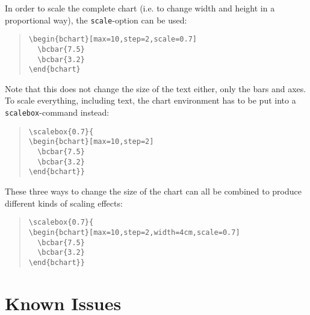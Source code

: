 \documentclass{article}
\begin{document}
In order to scale the complete chart (i.e. to change width and height in a proportional way), the \texttt{scale}-option can be used:
\begin{quote}\small
\begin{verbatim}
\begin{bchart}[max=10,step=2,scale=0.7]
  \bcbar{7.5}
  \bcbar{3.2}
\end{bchart}
\end{verbatim}
\end{quote}
\begin{quote}
\begin{bchart}[max=10,step=2,scale=0.7]
\end{bchart}
\end{quote}
Note that this does not change the size of the text either, only the bars and axes. To scale everything, including text, the chart environment has to be put into a \texttt{scalebox}-command instead:
\begin{quote}\small
\begin{verbatim}
\scalebox{0.7}{
\begin{bchart}[max=10,step=2]
  \bcbar{7.5}
  \bcbar{3.2}
\end{bchart}}
\end{verbatim}
\end{quote}
\begin{quote}
\end{quote}

These three ways to change the size of the chart can all be combined to produce different kinds of scaling effects:
\begin{quote}\small
\begin{verbatim}
\scalebox{0.7}{
\begin{bchart}[max=10,step=2,width=4cm,scale=0.7]
  \bcbar{7.5}
  \bcbar{3.2}
\end{bchart}}
\end{verbatim}
\end{quote}
\begin{quote}
\end{quote}


\section{Known Issues}
\end{document}
